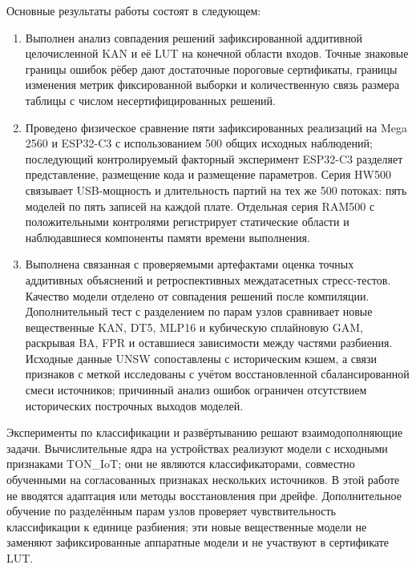 Основные результаты работы состоят в следующем:
\begin{enumerate}
\item Выполнен анализ совпадения решений зафиксированной аддитивной целочисленной KAN и её LUT на конечной области входов. Точные знаковые границы ошибок рёбер дают достаточные пороговые сертификаты, границы изменения метрик фиксированной выборки и количественную связь размера таблицы с числом несертифицированных решений.
\item Проведено физическое сравнение пяти зафиксированных реализаций на Mega 2560 и ESP32-C3 с использованием 500 общих исходных наблюдений; последующий контролируемый факторный эксперимент ESP32-C3 разделяет представление, размещение кода и размещение параметров. Серия HW500 связывает USB-мощность и длительность партий на тех же 500 потоках: пять моделей по пять записей на каждой плате. Отдельная серия RAM500 с положительными контролями регистрирует статические области и наблюдавшиеся компоненты памяти времени выполнения.
\item Выполнена связанная с проверяемыми артефактами оценка точных аддитивных объяснений и ретроспективных междатасетных стресс-тестов. Качество модели отделено от совпадения решений после компиляции. Дополнительный тест с разделением по парам узлов сравнивает новые вещественные KAN, DT5, MLP16 и кубическую сплайновую GAM, раскрывая BA, FPR и оставшиеся зависимости между частями разбиения. Исходные данные UNSW сопоставлены с историческим кэшем, а связи признаков с меткой исследованы с учётом восстановленной сбалансированной смеси источников; причинный анализ ошибок ограничен отсутствием исторических построчных выходов моделей.
\end{enumerate}

Эксперименты по классификации и развёртыванию решают взаимодополняющие задачи. Вычислительные ядра на устройствах реализуют модели с исходными признаками TON\_IoT; они не являются классификаторами, совместно обученными на согласованных признаках нескольких источников. В этой работе не вводятся адаптация или методы восстановления при дрейфе. Дополнительное обучение по разделённым парам узлов проверяет чувствительность классификации к единице разбиения; эти новые вещественные модели не заменяют зафиксированные аппаратные модели и не участвуют в сертификате LUT.

